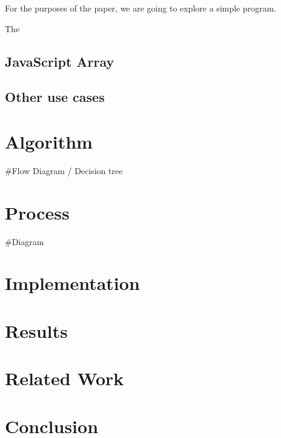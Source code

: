 \documentclass{article}
\begin{document}
For the purposes of the paper, we are going to explore a simple program.



The 

\subsection{JavaScript Array}

\subsection{Other use cases}

\section{Algorithm}

#Flow Diagram / Decision tree

\section{Process}

#Diagram

\section{Implementation}

\section{Results}

\section{Related Work}

\section{Conclusion}
\end{document}
